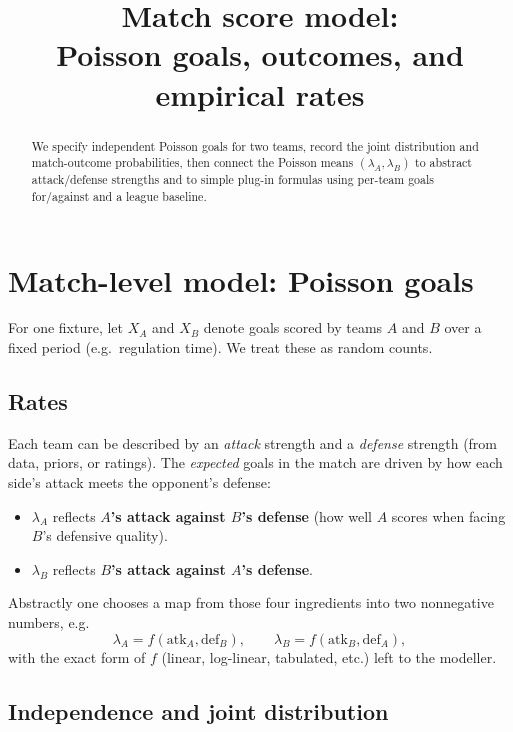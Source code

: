 \documentclass[11pt,a4paper]{article}
\title{Match score model:\\Poisson goals, outcomes, and empirical rates}
\author{}
\date{}
\begin{document}
\maketitle

\begin{abstract}
We specify independent Poisson goals for two teams, record the joint distribution and match-outcome probabilities, then connect the Poisson means $(\lambda_A,\lambda_B)$ to abstract attack/defense strengths and to simple plug-in formulas using per-team goals for/against and a league baseline.
\end{abstract}

\section{Match-level model: Poisson goals}
\label{sec:model}

For one fixture, let $X_A$ and $X_B$ denote goals scored by teams $A$ and $B$ over a fixed period (e.g.\ regulation time). We treat these as random counts.

\subsection{Rates}

Each team can be described by an \emph{attack} strength and a \emph{defense} strength (from data, priors, or ratings). The \emph{expected} goals in the match are driven by how each side's attack meets the opponent's defense:
\begin{itemize}
  \item $\lambda_A$ reflects \textbf{$A$'s attack against $B$'s defense} (how well $A$ scores when facing $B$'s defensive quality).
  \item $\lambda_B$ reflects \textbf{$B$'s attack against $A$'s defense}.
\end{itemize}
Abstractly one chooses a map from those four ingredients into two nonnegative numbers, e.g.
\[
  \lambda_A = f(\mathrm{atk}_A, \mathrm{def}_B), \qquad
  \lambda_B = f(\mathrm{atk}_B, \mathrm{def}_A),
\]
with the exact form of $f$ (linear, log-linear, tabulated, etc.) left to the modeller.

\subsection{Independence and joint distribution}
\end{document}

